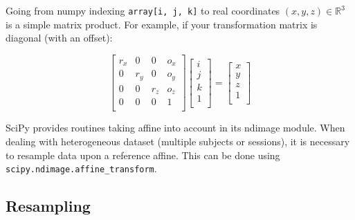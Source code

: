 \documentclass{frontiersSCNS} %
\begin{document}
Going from
numpy indexing \verb!array[i, j, k]! to real coordinates $(x, y, z) \in
\mathbb{R}^3$ is a simple matrix product. For example, if your transformation
matrix is diagonal (with an offset):

\[
    \begin{bmatrix}
        r_x & 0   & 0   & o_x \\
        0   & r_y & 0   & o_y \\
        0   & 0   & r_z & o_z \\
        0   & 0   & 0   & 1   \\
    \end{bmatrix}
    \begin{bmatrix}
        i \\
        j \\
        k \\
        1 \\
    \end{bmatrix}
    =
    \begin{bmatrix}
        x \\
        y \\
        z \\
        1 \\
    \end{bmatrix}
\]




SciPy provides routines taking affine into account in its ndimage module.
When dealing with heterogeneous dataset (multiple subjects or sessions), it is
necessary to resample data upon a reference affine. This can be done using
\texttt{scipy.ndimage.affine\_transform}.

\subsection{Resampling}
\label{resampling}
\end{document}
